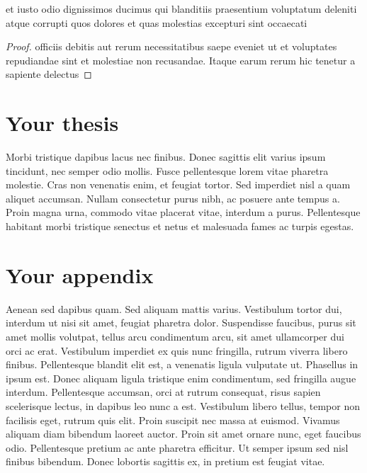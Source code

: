 \documentclass[12pt, twoside]{report}
\begin{document}
\begin{proposition}
    et iusto odio dignissimos ducimus qui blanditiis praesentium voluptatum deleniti atque corrupti quos dolores et quas molestias excepturi sint occaecati 
\end{proposition}
\begin{proof}
    officiis debitis aut rerum necessitatibus saepe eveniet ut et voluptates repudiandae sint et molestiae non recusandae. 
Itaque earum rerum hic tenetur a sapiente delectus
\end{proof}

\chapter{Your thesis}\label{chp:stuff}
Morbi tristique dapibus lacus nec finibus. 
Donec sagittis elit varius ipsum tincidunt, nec semper odio mollis. 
Fusce pellentesque lorem vitae pharetra molestie. 
Cras non venenatis enim, et feugiat tortor. 
Sed imperdiet nisl a quam aliquet accumsan.
Nullam consectetur purus nibh, ac posuere ante tempus a. 
Proin magna urna, commodo vitae placerat vitae, interdum a purus. 
Pellentesque habitant morbi tristique senectus et netus et malesuada fames ac turpis egestas. 

\appendix
\chapter{Your appendix}\label{apx:morestuff}
Aenean sed dapibus quam. 
Sed aliquam mattis varius. 
Vestibulum tortor dui, interdum ut nisi sit amet, feugiat pharetra dolor. 
Suspendisse faucibus, purus sit amet mollis volutpat, tellus arcu condimentum arcu, sit amet ullamcorper dui orci ac erat. 
Vestibulum imperdiet ex quis nunc fringilla, rutrum viverra libero finibus. 
Pellentesque blandit elit est, a venenatis ligula vulputate ut. 
Phasellus in ipsum est. Donec aliquam ligula tristique enim condimentum, sed fringilla augue interdum. 
Pellentesque accumsan, orci at rutrum consequat, risus sapien scelerisque lectus, in dapibus leo nunc a est. Vestibulum libero tellus, tempor non facilisis eget, rutrum quis elit.
Proin suscipit nec massa at euismod. Vivamus aliquam diam bibendum laoreet auctor.
Proin sit amet ornare nunc, eget faucibus odio. 
Pellentesque pretium ac ante pharetra efficitur. 
Ut semper ipsum sed nisl finibus bibendum. Donec lobortis sagittis ex, in pretium est feugiat vitae. 


  

\end{document}
